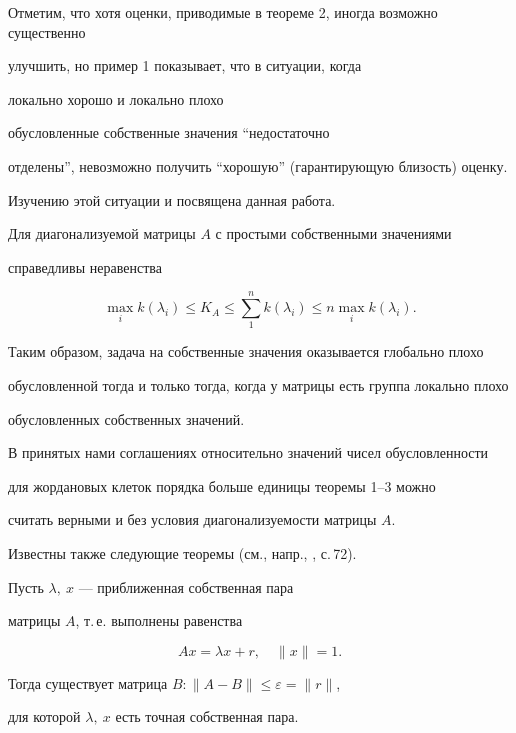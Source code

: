 Отметим, что хотя оценки, приводимые в теореме 2, иногда возможно существенно


улучшить, но пример 1 показывает, что в ситуации, когда 


локально хорошо и локально плохо 


обусловленные собственные значения ``недостаточно


отделены'', невозможно получить ``хорошую'' (гарантирующую близость) оценку.


Изучению этой ситуации и посвящена данная работа.





\begin{thm}


Для диагонализуемой матрицы $A$ с простыми собственными значениями


справедливы неравенства


$$


\max\limits_i k(\lambda_i)\le K_A\le\sum\limits_1^n k(\lambda_i)\le n\max


\limits_i k(\lambda_i).


$$


\end{thm}





Таким образом, задача на собственные значения оказывается глобально плохо 


обусловленной тогда и только тогда, когда у матрицы есть группа локально плохо


обусловленных собственных значений.





\begin{note}


В принятых нами соглашениях относительно значений чисел обусловленности 


для жордановых клеток порядка больше единицы теоремы 1--3 можно


считать верными и без условия диагонализуемости матрицы $A$.


\end{note}





Известны также следующие теоремы (см., напр., \cite{LI}, с.\,72).





\begin{thm}


Пусть $\lambda,\ x$ --- приближенная собственная пара


матрицы $A$, т.\,е. выполнены равенства


$$


Ax=\lambda x+r,\quad \|x\|=1.


$$


Тогда существует матрица $B:\|A-B\|\le \varepsilon=\|r\|$,


для которой $\lambda,\ x$ есть точная собственная пара.


\end{thm}





